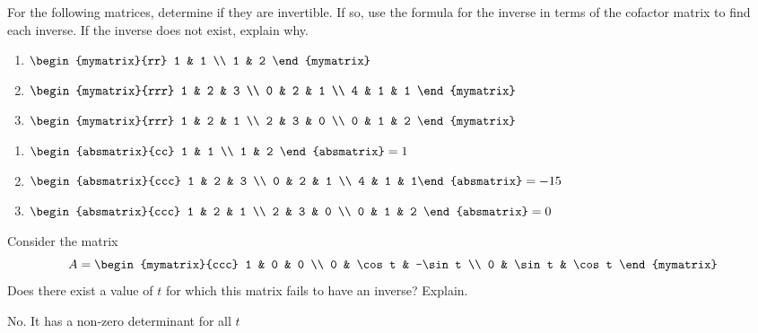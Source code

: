 \begin{enumialphparenastyle}
\begin{ex} For the following matrices, determine if they are invertible. If so, use the formula for the inverse in terms of the cofactor matrix to
find each inverse. If the inverse does not exist, explain why. 
\begin{enumerate}
\item
$\begin{mymatrix}{rr}
1 & 1 \\
1 & 2
\end{mymatrix}$
\item
$\begin{mymatrix}{rrr}
1 & 2 & 3 \\
0 & 2 & 1 \\
4 & 1 & 1
\end{mymatrix}$
\item
$\begin{mymatrix}{rrr}
1 & 2 & 1 \\
2 & 3 & 0 \\
0 & 1 & 2
\end{mymatrix} $
\end{enumerate}
\begin{sol}
\begin{enumerate}
\item $\begin{absmatrix}{cc}
1 & 1 \\
1 & 2
\end{absmatrix}= 1$
\item $\begin{absmatrix}{ccc}
1 & 2 & 3 \\
0 & 2 & 1 \\
4 & 1 & 1%
\end{absmatrix}= -15$
\item $\begin{absmatrix}{ccc}
1 & 2 & 1 \\
2 & 3 & 0 \\
0 & 1 & 2
\end{absmatrix}= 0$
\end{enumerate}
\end{sol}
\end{ex}

\begin{ex} Consider the matrix 
\begin{equation*}
A = 
\begin{mymatrix}{ccc}
1 & 0 & 0 \\
0 & \cos t & -\sin t \\
0 & \sin t & \cos t
\end{mymatrix}
\end{equation*}
Does there exist a value of $t$ for which this matrix fails to have an
inverse? Explain.
\begin{sol}
 No. It has a non-zero determinant for all $t$
\end{sol}
\end{ex}



\end{enumialphparenastyle}
